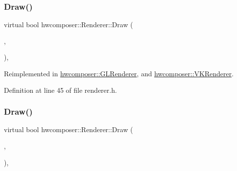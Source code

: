 \subsubsection{\texorpdfstring{Draw()}{Draw()}\hspace{0.1cm}{\footnotesize\ttfamily [1/2]}}
{\footnotesize\ttfamily virtual bool hwcomposer\+::\+Renderer\+::\+Draw (\begin{DoxyParamCaption}\item[{const std\+::vector$<$ \mbox{\hyperlink{structhwcomposer_1_1RenderState}{Render\+State}} $>$ \&}]{,  }\item[{\mbox{\hyperlink{classhwcomposer_1_1NativeSurface}{Native\+Surface}} $\ast$}]{ }\end{DoxyParamCaption})\hspace{0.3cm}{\ttfamily [inline]}, {\ttfamily [virtual]}}



Reimplemented in \mbox{\hyperlink{classhwcomposer_1_1GLRenderer_a961208b3640ffb78a15438ca4504fe1a}{hwcomposer\+::\+G\+L\+Renderer}}, and \mbox{\hyperlink{classhwcomposer_1_1VKRenderer_a05f1c449173cc2b4f479bf5be404ebb3}{hwcomposer\+::\+V\+K\+Renderer}}.



Definition at line 45 of file renderer.\+h.


\begin{DoxyCode}{0}
\end{DoxyCode}
\mbox{\label{classhwcomposer_1_1Renderer_a3811bf639ba6fd9b9891daf0b051b98b}} 
\subsubsection{\texorpdfstring{Draw()}{Draw()}\hspace{0.1cm}{\footnotesize\ttfamily [2/2]}}
{\footnotesize\ttfamily virtual bool hwcomposer\+::\+Renderer\+::\+Draw (\begin{DoxyParamCaption}\item[{const \mbox{\hyperlink{structhwcomposer_1_1MediaState}{Media\+State}} \&}]{,  }\item[{\mbox{\hyperlink{classhwcomposer_1_1NativeSurface}{Native\+Surface}} $\ast$}]{ }\end{DoxyParamCaption})\hspace{0.3cm}{\ttfamily [inline]}, {\ttfamily [virtual]}}



